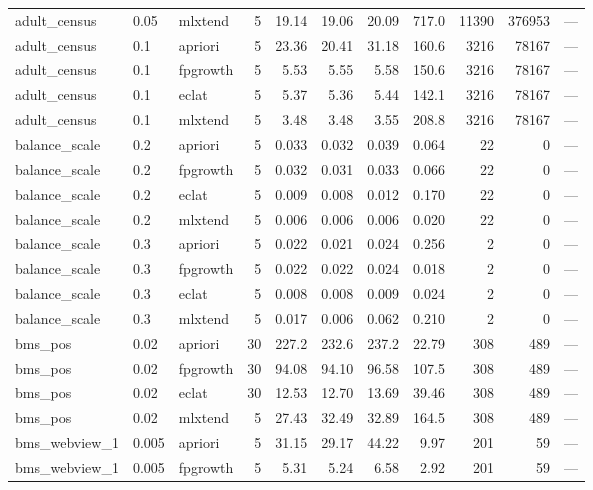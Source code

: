 \documentclass[twocolumn,10pt]{article}
\begin{document}
\begin{longtable}{p{3.0cm}llrrrrrrrp{2.4cm}}
adult\_\allowbreak{}census & 0.05 & mlxtend & 5 & 19.14 & 19.06 & 20.09 & 717.0 & 11390 & 376953 & --- \\
adult\_\allowbreak{}census & 0.1 & apriori & 5 & 23.36 & 20.41 & 31.18 & 160.6 & 3216 & 78167 & --- \\
adult\_\allowbreak{}census & 0.1 & fpgrowth & 5 & 5.53 & 5.55 & 5.58 & 150.6 & 3216 & 78167 & --- \\
adult\_\allowbreak{}census & 0.1 & eclat & 5 & 5.37 & 5.36 & 5.44 & 142.1 & 3216 & 78167 & --- \\
adult\_\allowbreak{}census & 0.1 & mlxtend & 5 & 3.48 & 3.48 & 3.55 & 208.8 & 3216 & 78167 & --- \\
balance\_\allowbreak{}scale & 0.2 & apriori & 5 & 0.033 & 0.032 & 0.039 & 0.064 & 22 & 0 & --- \\
balance\_\allowbreak{}scale & 0.2 & fpgrowth & 5 & 0.032 & 0.031 & 0.033 & 0.066 & 22 & 0 & --- \\
balance\_\allowbreak{}scale & 0.2 & eclat & 5 & 0.009 & 0.008 & 0.012 & 0.170 & 22 & 0 & --- \\
balance\_\allowbreak{}scale & 0.2 & mlxtend & 5 & 0.006 & 0.006 & 0.006 & 0.020 & 22 & 0 & --- \\
balance\_\allowbreak{}scale & 0.3 & apriori & 5 & 0.022 & 0.021 & 0.024 & 0.256 & 2 & 0 & --- \\
balance\_\allowbreak{}scale & 0.3 & fpgrowth & 5 & 0.022 & 0.022 & 0.024 & 0.018 & 2 & 0 & --- \\
balance\_\allowbreak{}scale & 0.3 & eclat & 5 & 0.008 & 0.008 & 0.009 & 0.024 & 2 & 0 & --- \\
balance\_\allowbreak{}scale & 0.3 & mlxtend & 5 & 0.017 & 0.006 & 0.062 & 0.210 & 2 & 0 & --- \\
bms\_\allowbreak{}pos & 0.02 & apriori & 30 & 227.2 & 232.6 & 237.2 & 22.79 & 308 & 489 & --- \\
bms\_\allowbreak{}pos & 0.02 & fpgrowth & 30 & 94.08 & 94.10 & 96.58 & 107.5 & 308 & 489 & --- \\
bms\_\allowbreak{}pos & 0.02 & eclat & 30 & 12.53 & 12.70 & 13.69 & 39.46 & 308 & 489 & --- \\
bms\_\allowbreak{}pos & 0.02 & mlxtend & 5 & 27.43 & 32.49 & 32.89 & 164.5 & 308 & 489 & --- \\
bms\_\allowbreak{}webview\_\allowbreak{}1 & 0.005 & apriori & 5 & 31.15 & 29.17 & 44.22 & 9.97 & 201 & 59 & --- \\
bms\_\allowbreak{}webview\_\allowbreak{}1 & 0.005 & fpgrowth & 5 & 5.31 & 5.24 & 6.58 & 2.92 & 201 & 59 & --- \\

\end{longtable}
\end{document}
